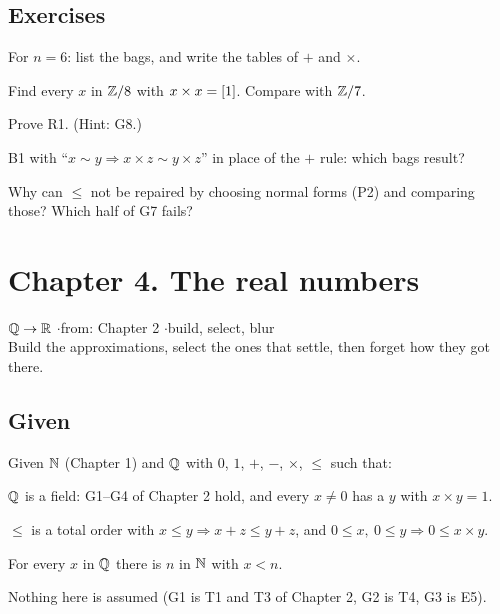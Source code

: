 \subsection*{Exercises}

\begin{lines}
\item[\lab{E1}] For $n = 6$: list the bags, and write the tables of $+$ and $\times$.
\item[\lab{E2}] Find every $x$ in $\mathbb{Z}/8$ with $x \times x = [1]$. Compare with $\mathbb{Z}/7$.
\item[\lab{E3}] Prove R1. (Hint: G8.)
\item[\lab{E4}] B1 with ``$x \sim y \Rightarrow x \times z \sim y \times z$'' in place of the $+$ rule: which bags result?
\item[\lab{E5}] Why can $\le$ not be repaired by choosing normal forms (P2) and comparing those? Which half of G7 fails?
\end{lines}

\newpage

\section*{Chapter 4. The real numbers}
\begin{center}
{\normalsize $\mathbb{Q} \to \mathbb{R}$ \quad$\cdot$\quad from: Chapter 2 \quad$\cdot$\quad build, select, blur}\\[4pt]
{\small Build the approximations, select the ones that settle, then forget how they got there.}
\end{center}

\subsection*{Given}

Given $\mathbb{N}$ (Chapter 1) and $\mathbb{Q}$ with $0$, $1$, $+$, $-$, $\times$, $\le$ such that:
\begin{lines}
\item[\lab{G1}] $\mathbb{Q}$ is a field: G1--G4 of Chapter 2 hold, and every $x \neq 0$ has a $y$ with $x \times y = 1$.
\item[\lab{G2}] $\le$ is a total order with $x \le y \Rightarrow x + z \le y + z$, and $0 \le x,\ 0 \le y \Rightarrow 0 \le x \times y$.
\item[\lab{G3}] For every $x$ in $\mathbb{Q}$ there is $n$ in $\mathbb{N}$ with $x < n$.
\end{lines}
Nothing here is assumed (G1 is T1 and T3 of Chapter 2, G2 is T4, G3 is E5).

